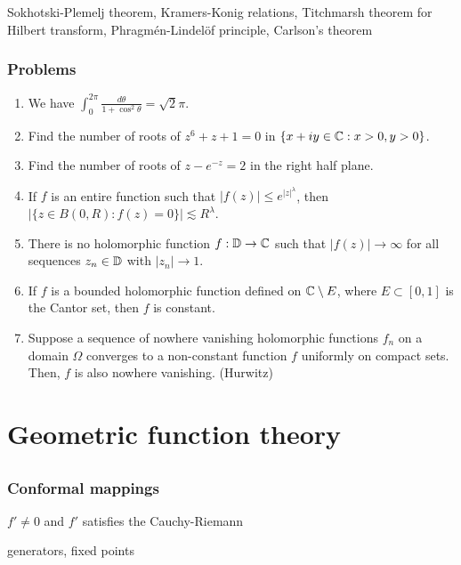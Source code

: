 \documentclass{../../large}
\begin{document}
Sokhotski-Plemelj theorem,
Kramers-Konig relations,
Titchmarsh theorem for Hilbert transform,
Phragm\'en-Lindel\"of principle,
Carlson's theorem

\section*{Problems}
\begin{enumerate}
\item We have $\int_0^{2\pi}\frac{d\theta}{1+\cos^2\theta}=\sqrt2\pi$.
\item Find the number of roots of $z^6+z+1=0$ in $\{x+iy\in\mathbb{C}:x>0,y>0\}$.
\item Find the number of roots of $z-e^{-z}=2$ in the right half plane.
\item If $f$ is an entire function such that $|f(z)|\le e^{|z|^\lambda}$, then $|\{z\in B(0,R):f(z)=0\}|\lesssim R^\lambda$.
\item There is no holomorphic function $f:\mathbb{D}\to\mathbb{C}$ such that $|f(z)|\to\infty$ for all sequences $z_n\in\mathbb{D}$ with $|z_n|\to1$.
\item If $f$ is a bounded holomorphic function defined on $\mathbb{C}\setminus E$, where $E\subset[0,1]$ is the Cantor set, then $f$ is constant.
\item Suppose a sequence of nowhere vanishing holomorphic functions $f_n$ on a domain $\Omega$ converges to a non-constant function $f$ uniformly on compact sets.
Then, $f$ is also nowhere vanishing. (Hurwitz)
\end{enumerate}






\part{Geometric function theory}

\chapter{}
\section{Conformal mappings}
\begin{prb}
$f'\ne0$ and $f'$ satisfies the Cauchy-Riemann
\end{prb}
\begin{prb}
generators,
fixed points
\end{prb}
\begin{prb}
\end{prb}
\end{document}
